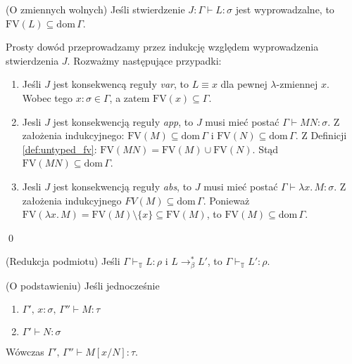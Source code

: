 \begin{lemat}(O zmiennych wolnych)
  Jeśli stwierdzenie \(J: \Gamma \vdash L:\sigma\) jest wyprowadzalne, to \(\mathrm{FV}(L)\subseteq \mathrm{dom}\,\Gamma\).
\end{lemat}
\begin{dowod}
  Prosty dowód przeprowadzamy przez indukcję względem wyprowadzenia stwierdzenia \(J\). Rozważmy następujące przypadki:
  \begin{enumerate}[label=(\alph*)]
    \setlength\itemsep{0em}
    \item Jeśli \(J\) jest konsekwencą reguły \emph{var}, to \(L\equiv x\) dla pewnej \(\lambda\)-zmiennej \(x\). Wobec tego \(x:\sigma\in\Gamma\), a zatem \(\mathrm{FV}(x)\subseteq\Gamma\).
    \item Jesli \(J\) jest konsekwencją reguły \emph{app}, to \(J\) musi mieć postać \(\Gamma\vdash MN:\sigma\). Z założenia indukcyjnego: \(\mathrm{FV}(M)\subseteq \mathrm{dom}\,\Gamma\) i  \(\mathrm{FV}(N)\subseteq \mathrm{dom}\,\Gamma\). Z Definicji \ref{def:untyped_fv}: \(\mathrm{FV}(MN)=\mathrm{FV}(M)\cup\mathrm{FV}(N)\). Stąd \(\mathrm{FV}(MN)\subseteq \mathrm{dom}\,\Gamma\).
    \item Jesli \(J\) jest konsekwencją reguły \emph{abs}, to \(J\) musi mieć postać \(\Gamma\vdash \lambda x.\,M:\sigma\). Z założenia indukcyjnego \(FV(M)\subseteq\mathrm{dom}\,\Gamma\). Ponieważ \(\mathrm{FV}(\lambda x.\,M)=\mathrm{FV}(M)\setminus\{x\}\subseteq\mathrm{FV}(M)\), to \(\mathrm{FV}(M)\subseteq\mathrm{dom}\,\Gamma\). 
  \end{enumerate}  
  \qed
\end{dowod}

\begin{lemat}(Redukcja podmiotu)
  Jeśli \(\Gamma\vdash_\mathbb{T} L:\rho\) i \(L\to^{*}_\beta L'\), to \(\Gamma\vdash_\mathbb{T}L':\rho\).
\end{lemat}
\begin{dowod}
\end{dowod}

\begin{lemat}(O podstawieniu)
Jeśli jednocześnie
  \begin{enumerate}[label=(\alph*)]
    \setlength\itemsep{0em}
    \item \(\Gamma',\,x:\sigma,\,\Gamma''\vdash M:\tau\)
    \item \(\Gamma' \vdash N:\sigma\)
  \end{enumerate}
  Wówczas \(\Gamma',\,\Gamma''\vdash M[x/N]:\tau\).
\end{lemat}
